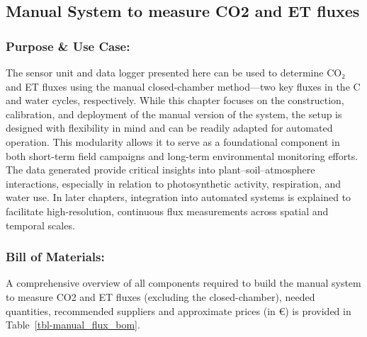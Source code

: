 \documentclass[
  11pt,
  letterpaper,
]{book}
\begin{document}
\subsection{Manual System to measure CO2 and ET
fluxes}\label{sec-manual-flux}

\subsubsection{Purpose \& Use Case:}\label{sec-manual-flux-purpose}

The sensor unit and data logger presented here can be used to determine
CO₂ and ET fluxes using the manual closed-chamber method---two key
fluxes in the C and water cycles, respectively. While this chapter
focuses on the construction, calibration, and deployment of the manual
version of the system, the setup is designed with flexibility in mind
and can be readily adapted for automated operation. This modularity
allows it to serve as a foundational component in both short-term field
campaigns and long-term environmental monitoring efforts. The data
generated provide critical insights into plant--soil--atmosphere
interactions, especially in relation to photosynthetic activity,
respiration, and water use. In later chapters, integration into
automated systems is explained to facilitate high-resolution, continuous
flux measurements across spatial and temporal scales.

\subsubsection{Bill of Materials:}\label{sec-manual-flux-bom}

A comprehensive overview of all components required to build the manual
system to measure CO2 and ET fluxes (excluding the closed-chamber),
needed quantities, recommended suppliers and approximate prices (in €)
is provided in Table~\ref{tbl-manual_flux_bom}.
\end{document}
